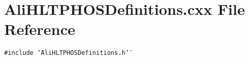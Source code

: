 \section{Ali\-HLTPHOSDefinitions.cxx File Reference}
\label{AliHLTPHOSDefinitions_8cxx}


{\tt \#include \char`\"{}Ali\-HLTPHOSDefinitions.h\char`\"{}}\par
